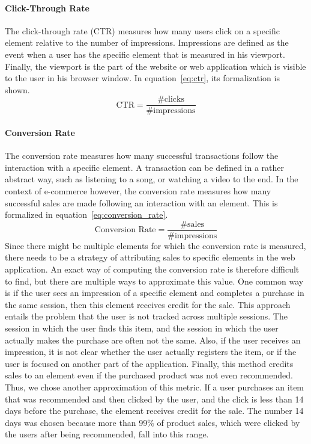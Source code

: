 \paragraph{Click-Through Rate}
The click-through rate (CTR) measures how many users click on a specific element relative to the number of impressions.
Impressions are defined as the event when a user has the specific element that is measured in his viewport.
Finally, the viewport is the part of the website or web application which is visible to the user in his browser window.
In equation~\ref{eq:ctr}, its formalization is shown.
\begin{equation}\label{eq:ctr}
    \text{CTR} = \frac{\#\text{clicks}}{\#\text{impressions}}
\end{equation}
\paragraph{Conversion Rate}\label{sec:conversion_rate}
The conversion rate measures how many successful transactions follow the interaction with a specific element.
A transaction can be defined in a rather abstract way, such as listening to a song, or watching a video to the end.
In the context of e-commerce however, the conversion rate measures how many successful sales are made following an interaction with an element.
This is formalized in equation~\ref{eq:conversion_rate}.
\begin{equation}\label{eq:conversion_rate}
    \text{Conversion Rate} = \frac{\#\text{sales}}{\#\text{impressions}}
\end{equation}
Since there might be multiple elements for which the conversion rate is measured, there needs to be a strategy of attributing sales to specific elements in the web application.
An exact way of computing the conversion rate is therefore difficult to find, but there are multiple ways to approximate this value.
One common way is if the user sees an impression of a specific element and completes a purchase in the same session, then this element receives credit for the sale.
This approach entails the problem that the user is not tracked across multiple sessions.
The session in which the user finds this item, and the session in which the user actually makes the purchase are often not the same.
Also, if the user receives an impression, it is not clear whether the user actually registers the item, or if the user is focused on another part of the application.
Finally, this method credits sales to an element even if the purchased product was not even recommended.
Thus, we chose another approximation of this metric.
If a user purchases an item that was recommended and then clicked by the user, and the click is less than 14 days before the purchase, the element receives credit for the sale.
The number 14 days was chosen because more than 99\% of product sales, which were clicked by the users after being recommended, fall into this range.